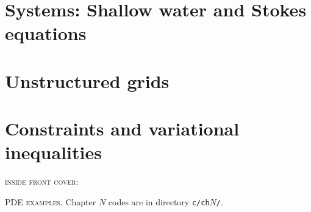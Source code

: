 \documentclass{tufte-book}
\newcommand{\CODELOC}{}  %
\newcommand{\stubinput}[2]{}
\newcommand{\stubinput}[2]{\vspace{5cm} \centerline{\LARGE Percent completed:  \Huge #2\%.} \vfill}
\theoremstyle{definition}
\begin{document}
\chapter{Systems: Shallow water and Stokes equations}
\label{chap:sy}
\renewcommand{\CODELOC}{ch10/}
\stubinput{stokes.tex}{5}

\chapter{Unstructured grids}
\label{chap:dp}
\renewcommand{\CODELOC}{ch11/}
\stubinput{dmplex.tex}{0}

\chapter{Constraints and variational inequalities}
\label{chap:co}
\renewcommand{\CODELOC}{ch12/}



\backmatter




\clearpage

\newcommand{\tblockeqncode}[3]{
\begin{tabular}[t]{l} #1 \\ \quad {\normalsize \texttt{#3}} \\ \qquad \fbox{\small #2} \end{tabular}
}
\newcommand{\tblockcode}[2]{
\begin{tabular}[t]{l} #1 \\ \quad {\normalsize \texttt{#2}} \end{tabular}
}
\newcommand{\tblock}[1]{
\begin{tabular}[t]{l} #1 \end{tabular}
}

\clearpage
\thispagestyle{empty}
\noindent \textsc{inside front cover:}

\vfill
{\large \noindent \textsc{PDE examples}.} \quad Chapter $N$ codes are in directory \texttt{c/ch}$N$\texttt{/}.
\end{document}
